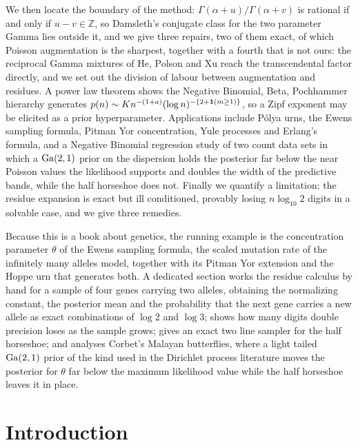 \begin{chaptersummary}
We then locate the boundary of the method: $\Gamma(\alpha+u)/\Gamma(\alpha+v)$ is rational if and only if $u-v\in\mathbb{Z}$, so Damsleth's \citeyearpar{rc:damsleth1975} conjugate class for the two parameter Gamma lies outside it, and we give three repairs, two of them exact, of which Poisson augmentation is the sharpest, together with a fourth that is not ours: the reciprocal Gamma mixtures of He, Polson and Xu reach the transcendental factor directly, and we set out the division of labour between augmentation and residues. A power law theorem shows the Negative Binomial, Beta, Pochhammer hierarchy generates $p(n)\sim Kn^{-(1+a)}(\log n)^{-\{2+\mathbf{1}(m\ge1)\}}$, so a Zipf exponent may be elicited as a prior hyperparameter. Applications include P\'olya urns, the Ewens sampling formula, Pitman Yor concentration, Yule processes and Erlang's formula, and a Negative Binomial regression study of two count data sets in which a $\mathrm{Ga}(2,1)$ prior on the dispersion holds the posterior far below the near Poisson values the likelihood supports and doubles the width of the predictive bands, while the half horseshoe does not. Finally we quantify a limitation: the residue expansion is exact but ill conditioned, provably losing $n\log_{10}2$ digits in a solvable case, and we give three remedies.

Because this is a book about genetics, the running example is the concentration parameter $\theta$ of the Ewens sampling formula, the scaled mutation rate of the infinitely many alleles model, together with its Pitman Yor extension and the Hoppe urn that generates both. A dedicated section works the residue calculus by hand for a sample of four genes carrying two alleles, obtaining the normalizing constant, the posterior mean and the probability that the next gene carries a new allele as exact combinations of $\log2$ and $\log3$; shows how many digits double precision loses as the sample grows; gives an exact two line sampler for the half horseshoe; and analyses Corbet's Malayan butterflies, where a light tailed $\mathrm{Ga}(2,1)$ prior of the kind used in the Dirichlet process literature moves the posterior for $\theta$ far below the maximum likelihood value while the half horseshoe leaves it in place.
\end{chaptersummary}

\section{Introduction}\label{rc:sec:intro}

